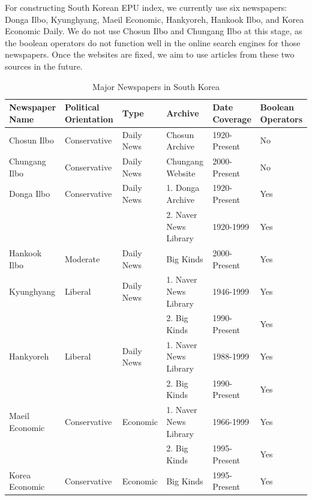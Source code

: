 For constructing South Korean EPU index, we currently use six newspapers: Donga Ilbo, Kyunghyang, Maeil Economic, Hankyoreh, Hankook Ilbo, and Korea Economic Daily. We do not use Chosun Ilbo and Chungang Ilbo at this stage, as the boolean operators do not function well in the online search engines for those newspapers. Once the websites are fixed, we aim to use articles from these two sources in the future. 


\begin{table}[H]
\caption{Major Newspapers in South Korea} \label{tab:majornews}
\begin{footnotesize}
\begin{tabular}{L{2.6cm} L{2.3cm}  L{2.2cm} L{3.5cm} L{2.1cm} L{2.1cm}}
\toprule
\textbf{Newspaper Name} & \textbf{Political Orientation} & \textbf{Type} & \textbf{Archive} & \textbf{Date Coverage} & \textbf{Boolean Operators} \\ \midrule
Chosun Ilbo & Conservative & Daily News & Chosun Archive & 1920-Present & No \\ \midrule
Chungang Ilbo & Conservative & Daily News & Chungang Website  & 2000-Present & No \\ \midrule
Donga Ilbo & Conservative & Daily News & 1. Donga Archive & 1920-Present & Yes \\
 &  &  & 2. Naver News Library & 1920-1999 & Yes \\ \midrule
Hankook Ilbo & Moderate & Daily News & Big Kinds & 2000-Present & Yes \\ \midrule
Kyunghyang  &  Liberal & Daily News & 1. Naver News Library &  1946-1999 & Yes \\
 &  & & 2. Big Kinds &  1990-Present & Yes \\ \midrule			
Hankyoreh & Liberal & Daily News & 1. Naver News Library & 1988-1999 & Yes \\
 & & & 2. Big Kinds & 1990-Present & Yes \\ \midrule
Maeil Economic & Conservative & Economic & 1. Naver News Library & 1966-1999 & Yes \\
 & & & 2. Big Kinds & 1995-Present & Yes \\ \midrule
Korea Economic & Conservative & Economic & Big Kinds & 1995-Present & Yes \\ \bottomrule
\end{tabular}
\end{footnotesize}
\end{table}


